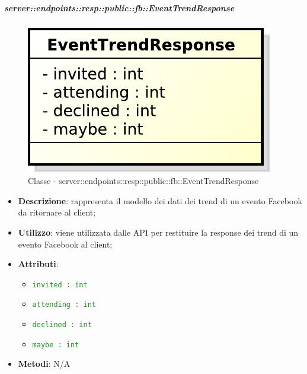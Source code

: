     \subparagraph{server::endpoints::resp::public::fb::EventTrendResponse} %
    \label{subp:bdsm_app_server_endpoints_resp_public_fb_eventtrendresponse}
  \begin{figure}[!htbp]
    \centering
    \centerline{\includegraphics[scale=0.6]{./images/server/classes/endpoints/fb/event_trend_response.pdf}}
    \caption{Classe - server::endpoints::resp::public::fb::EventTrendResponse}
  \end{figure}
    \begin{itemize}
      \item \textbf{Descrizione}: rappresenta il modello dei dati dei trend di un evento Facebook da ritornare al client;
      \item \textbf{Utilizzo}: viene utilizzata dalle API per restituire la response dei trend di un evento Facebook al client;

    \item \textbf{Attributi}:
      \begin{itemize}
        \item \textcolor{forestgreen}{\texttt{invited : int}}
        \item \textcolor{forestgreen}{\texttt{attending : int}}
        \item \textcolor{forestgreen}{\texttt{declined : int}}
        \item \textcolor{forestgreen}{\texttt{maybe : int}}
      \end{itemize}
    \item \textbf{Metodi}: N/A
      \end{itemize}
